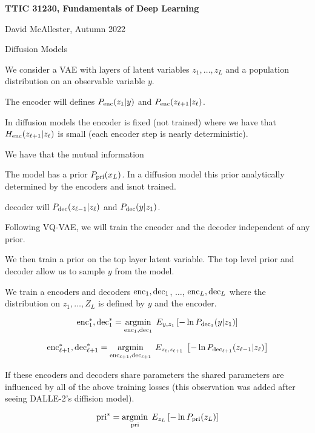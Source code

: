 





{\Huge

  \centerline{\bf TTIC 31230, Fundamentals of Deep Learning}
  \bigskip
  \centerline{David McAllester, Autumn 2022}
  \vfill
  \vfil
  \centerline{Diffusion Models}
  \vfill
  \vfill


We consider a VAE with layers of latent variables $z_1,\dots,z_{L}$ and a population distribution on an observable variable $y$.

\vfill
The encoder will defines $P_{\mathrm{enc}}(z_1|y)$ and $P_{\mathrm{enc}}(z_{\ell+1}|z_\ell)$.

\vfill
In diffusion models the encoder is fixed (not trained) where we have that $H_{\mathrm{enc}}(z_{\ell+1}|z_\ell)$ is small (each encoder step is nearly deterministic).

\vfill
We have that the mutual information

\vfill
The model has a prior $P_{\mathrm{pri}}(x_L)$.  In a diffusion model this prior analytically determined by the encoders and isnot trained.

decoder will $P_{\mathrm{dec}}(z_{\ell-1}|z_\ell)$ and $P_{\mathrm{dec}}(y|z_1)$.

\vfill
Following VQ-VAE, we will train the encoder and the decoder independent of any prior.

\vfill
We then train a prior on the top layer latent variable.  The top level prior and decoder allow us to sample $y$ from the model.


We train a encoders and decoders $\mathrm{enc}_1,\mathrm{dec}_1$, $\ldots$, $\mathrm{enc}_L,\mathrm{dec}_L$ where the distribution on $z_1,\ldots,Z_L$ is defined by $y$ and the encoder.

$$\mathrm{enc}_1^*,\mathrm{dec}_1^* =\operatorname*{argmin}_{\mathrm{enc}_1,\mathrm{dec}_1}\;E_{y,z_1} \left[-\ln P_{\mathrm{dec}_1}(y|z_1)\right]$$

\vfill
$$\mathrm{enc}_{\ell+1}^*,\mathrm{dec}_{\ell+1}^* = \operatorname*{argmin}_{\mathrm{enc}_{\ell+1},\mathrm{dec}_{\ell+1}}\;E_{z_\ell,z_{\ell+1}}\;\left[-\ln P_{\mathrm{dec}_{\ell+1}}(z_{\ell-1}|z_\ell)\right]$$

\vfill
If these encoders and decoders share parameters the shared parameters are influenced by all of the above training losses (this observation was added
after seeing DALLE-2's diffision model).


$$\mathrm{pri}^*   =  \operatorname*{argmin}_{\mathrm{pri}}\;E_{z_L}\left[-\ln P_{\mathrm{pri}}(z_L)\right]$$

}
